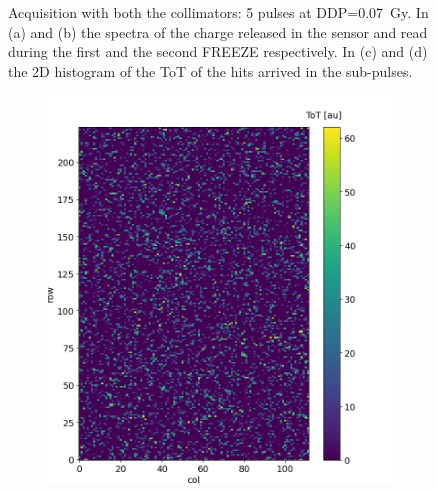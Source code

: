 \begin{figure}
\begin{subfigure}[b]{0.49\textwidth}
         \caption{}
         \label{fig:hb}
     \end{subfigure}
       \caption{Acquisition with both the collimators: 5 pulses at DDP=\SI{0.07}{Gy}. In (a) and (b) the spectra of the charge released in the sensor and read during the first and the second FREEZE respectively. In (c) and (d) the 2D histogram of the ToT of the hits arrived in the sub-pulses.}
       \label{fig:with_collimator}
  \end{figure}

   \begin{figure}
      \begin{subfigure}[b]{0.49\textwidth}
         \centering
         \includegraphics[width=\linewidth]{figures/test_beam/tot_mapq1_15-57.png}   
         \caption{}
         \label{fig:aa1}
     \end{subfigure}
     \hfill
     \begin{subfigure}[b]{0.49\textwidth}
         \centering

\end{subfigure}
\end{figure}
